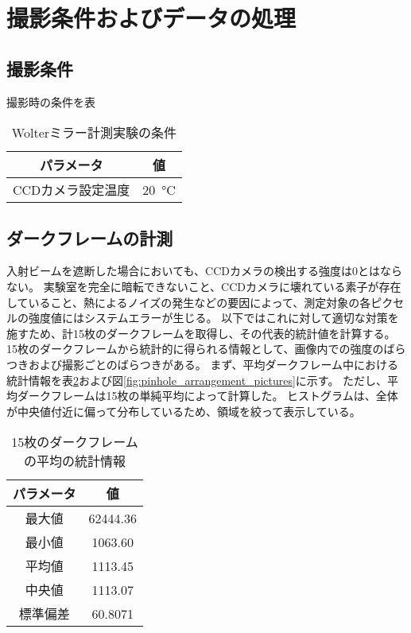 \section{撮影条件およびデータの処理}

\subsection{撮影条件}
撮影時の条件を表

\begin{table}[!ht]
\begin{center}
  \begin{tabular}{|c|c|} \hline
    パラメータ & 値 \\ \hline
    CCDカメラ設定温度 & \SI{20}{\degreeCelsius}  \\ \hline
  \end{tabular}
  \caption{Wolterミラー計測実験の条件}
  \label{tb:mirror_experiment_params}
\end{center}
\end{table}

\subsection{ダークフレームの計測}
\label{chap5_darkflame_measurement}

入射ビームを遮断した場合においても、CCDカメラの検出する強度は0とはならない。
実験室を完全に暗転できないこと、CCDカメラに壊れている素子が存在していること、熱によるノイズの発生などの要因によって、測定対象の各ピクセルの強度値にはシステムエラーが生じる。
以下ではこれに対して適切な対策を施すため、計15枚のダークフレームを取得し、その代表的統計値を計算する。
15枚のダークフレームから統計的に得られる情報として、画像内での強度のばらつきおよび撮影ごとのばらつきがある。
まず、平均ダークフレーム中における統計情報を表\ref{tb:darkflame_average_data}および図\ref{fig:pinhole_arrangement_pictures}に示す。
ただし、平均ダークフレームは15枚の単純平均によって計算した。
ヒストグラムは、全体が中央値付近に偏って分布しているため、領域を絞って表示している。

\begin{table}[!ht]
\begin{center}
  \begin{tabular}{|c|c|} \hline
    パラメータ & 値 \\ \hline
    最大値 & 62444.36 \\
    最小値 & 1063.60 \\
    平均値 & 1113.45 \\
    中央値 & 1113.07 \\
    標準偏差 & 60.8071 \\ \hline
  \end{tabular}
  \caption{15枚のダークフレームの平均の統計情報}
  \label{tb:darkflame_average_data}
\end{center}
\end{table}

